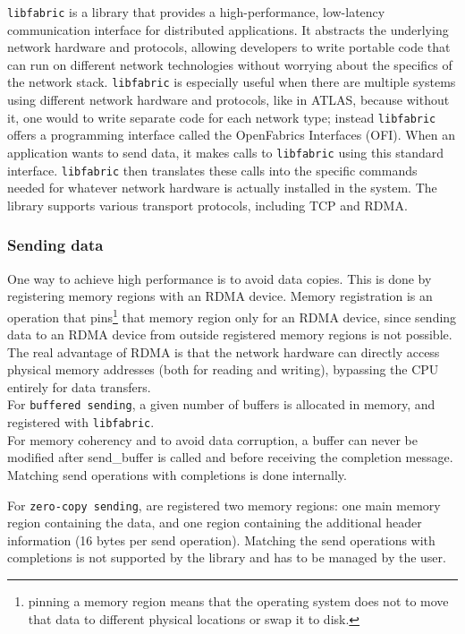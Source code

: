 \texttt{libfabric} \cite{libfabric} is a library that provides a high-performance, low-latency communication interface for distributed applications. It abstracts the underlying network hardware and protocols, allowing developers to write portable code that can run on different network technologies without worrying about the specifics of the network stack. \texttt{libfabric} is especially useful when there are multiple systems using different network hardware and protocols, like in \acs{ATLAS}, because without it, one would to write separate code for each network type; instead \texttt{libfabric} offers a programming interface called the OpenFabrics Interfaces (OFI). When an application wants to send data, it makes calls to \texttt{libfabric} using this standard interface. \texttt{libfabric} then translates these calls into the specific commands needed for whatever network hardware is actually installed in the system. The library supports various transport protocols, including TCP and \acs{RDMA}.

\subsubsection{Sending data}

One way to achieve high performance is to avoid data copies. This is done by registering memory regions with an \acs{RDMA} device. Memory registration is an operation that pins\footnote{pinning a memory region means that the operating system does not to move that data to different physical locations or swap it to disk.} that memory region only for an \acs{RDMA} device, since sending data to an \acs{RDMA} device from outside registered memory regions is not possible. The real advantage of RDMA is that the network hardware can directly access physical memory addresses (both for reading and writing), bypassing the CPU entirely for data transfers.\\

For \texttt{buffered sending}, a given number of buffers is allocated in memory, and registered with \texttt{libfabric}.\\
For memory coherency and to avoid data corruption, a buffer can never be modified after send\_buffer is called and before receiving the completion message. Matching send operations with completions is done internally.

For \texttt{zero-copy sending}, are registered two memory regions: one main memory region containing the data, and one region containing the additional header information (16 bytes per send operation).  Matching the send operations with completions is not supported by the library and has to be managed by the user.

